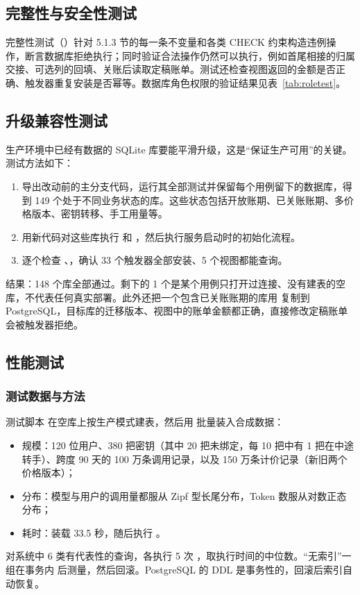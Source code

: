 \subsection{完整性与安全性测试}

完整性测试（）针对 5.1.3 节的每一条不变量和各类 CHECK 约束构造违例操作，断言数据库拒绝执行；同时验证合法操作仍然可以执行，例如首尾相接的归属交接、可选列的回填、关账后读取定稿账单。测试还检查视图返回的金额是否正确、触发器重复安装是否幂等。数据库角色权限的验证结果见表~\ref{tab:roletest}。

\subsection{升级兼容性测试}

生产环境中已经有数据的 SQLite 库要能平滑升级，这是“保证生产可用”的关键。测试方法如下：
\begin{enumerate}
  \item 导出改动前的主分支代码，运行其全部测试并保留每个用例留下的数据库，得到 149 个处于不同业务状态的库。这些状态包括开放账期、已关账账期、多价格版本、密钥转移、手工用量等。
  \item 用新代码对这些库执行  和 ，然后执行服务启动时的初始化流程。
  \item 逐个检查 、，确认 33 个触发器全部安装、5 个视图都能查询。
\end{enumerate}
结果：148 个库全部通过。剩下的 1 个是某个用例只打开过连接、没有建表的空库，不代表任何真实部署。此外还把一个包含已关账账期的库用  复制到 PostgreSQL，目标库的迁移版本、视图中的账单金额都正确，直接修改定稿账单会被触发器拒绝。

\subsection{性能测试}

\subsubsection{测试数据与方法}

测试脚本  在空库上按生产模式建表，然后用  批量装入合成数据：
\begin{itemize}
  \item 规模：120 位用户、380 把密钥（其中 20 把未绑定，每 10 把中有 1 把在中途转手）、跨度 90 天的 100 万条调用记录，以及 150 万条计价记录（新旧两个价格版本）；
  \item 分布：模型与用户的调用量都服从 Zipf 型长尾分布，Token 数服从对数正态分布；
  \item 耗时：装载 33.5 秒，随后执行 。
\end{itemize}
对系统中 6 类有代表性的查询，各执行 5 次 ，取执行时间的中位数。“无索引”一组在事务内  后测量，然后回滚。PostgreSQL 的 DDL 是事务性的，回滚后索引自动恢复。

